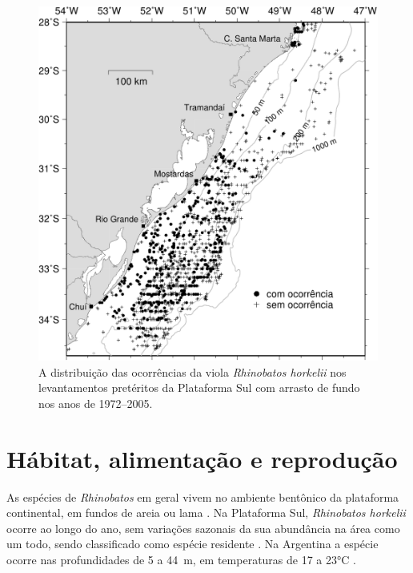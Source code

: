 \documentclass[a4paper,11pt,twoside,showtrims,onecolumn,openright,final]{memoir}
\begin{document}
\begin{figure}
\begin{center}
\includegraphics[width=\textwidth]{MAPA_OCORRENCIAS_VIOLA}
\end{center}
\caption[A distribuição das ocorrências da viola \emph{Rhinobatos horkelii} nos levantamentos 
	 pretéritos da Plataforma Sul com arrasto de fundo]
	{A distribuição das ocorrências da viola \emph{Rhinobatos horkelii} nos levantamentos 
	 pretéritos da Plataforma Sul com arrasto de fundo nos anos de 1972--2005.}
\label{fig:mapa-viola-ocorrencias}
\end{figure}


\section*{Hábitat, alimentação e reprodução}

As espécies de \emph{Rhinobatos} em geral vivem no ambiente bentônico da plataforma 
continental, em fundos de areia ou lama \citep{poll1951,bigelow1953,last1994}. %
Na Plataforma Sul, \emph{Rhinobatos horkelii} ocorre ao longo do ano, sem variações sazonais da sua 
abundância na área como um todo, sendo classificado como espécie residente \citep{vooren1997}. %
Na Argentina a espécie ocorre nas profundidades de 5 a 44~m, em temperaturas 
de 17 a 23°C \citep{menni2000}. %
\end{document}
